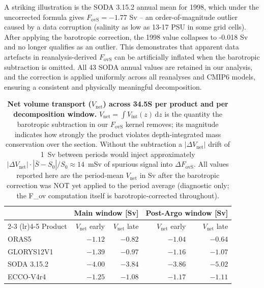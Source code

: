 \documentclass[11pt,a4paper]{article}
\newcommand{\Fovs}{F_\mathrm{ovS}}
\begin{document}
A striking illustration is the SODA 3.15.2 annual mean for 1998, which under the uncorrected formula gives \(F_{\mathrm{ovS}} = -1.77\) Sv -- an order-of-magnitude outlier caused by a data corruption (salinity as low as 13-17 PSU in some grid cells). After applying the barotropic correction, the 1998 value collapses to -0.018 Sv and no longer qualifies as an outlier. This demonstrates that apparent data artefacts in reanalysis-derived \(F_{\mathrm{ovS}}\) can be artificially inflated when the barotropic subtraction is omitted. All 43 SODA annual values are retained in our analysis, and the correction is applied uniformly across all reanalyses and CMIP6 models, ensuring a consistent and physically meaningful decomposition.

\begin{table}
\centering
\caption{\textbf{Net volume transport ($V_\mathrm{net}$) across 34.5\textdegree S per product and per decomposition window.} $V_\mathrm{net} = \int V_\mathrm{int}(z)\,\mathrm{d}z$ is the quantity the barotropic subtraction in our $\Fovs$ kernel removes; its magnitude indicates how strongly the product violates depth-integrated mass conservation over the section. Without the subtraction a $|\Delta V_\mathrm{net}|$ drift of 1~Sv between periods would inject approximately $|\Delta V_\mathrm{net}|\cdot|\bar{S}-S_0|/S_0 \approx 14$~mSv of spurious signal into $\Delta\Fovs$. All values reported here are the period-mean $V_\mathrm{net}$ in Sv after the barotropic correction was NOT yet applied to the period average (diagnostic only; the F\_ov computation itself is barotropic-corrected throughout).}
\label{tab:T1}
\small
\begin{tabular}{lrrrr}
\toprule
 & \multicolumn{2}{c}{Main window [Sv]} & \multicolumn{2}{c}{Post-Argo window [Sv]} \\
\cmidrule(lr){2-3} \cmidrule(lr){4-5}
Product & $V_\mathrm{net}$ early & $V_\mathrm{net}$ late & $V_\mathrm{net}$ early & $V_\mathrm{net}$ late \\
\midrule
ORAS5 & $-1.12$ & $-0.82$ & $-1.04$ & $-0.64$ \\
GLORYS12V1 & $-1.39$ & $-0.97$ & $-1.16$ & $-1.07$ \\
SODA 3.15.2 & $-4.00$ & $-3.84$ & $-3.86$ & $-5.02$ \\
ECCO-V4r4 & $-1.25$ & $-1.08$ & $-1.17$ & $-1.11$ \\
\bottomrule
\end{tabular}
\end{table}
\end{document}
